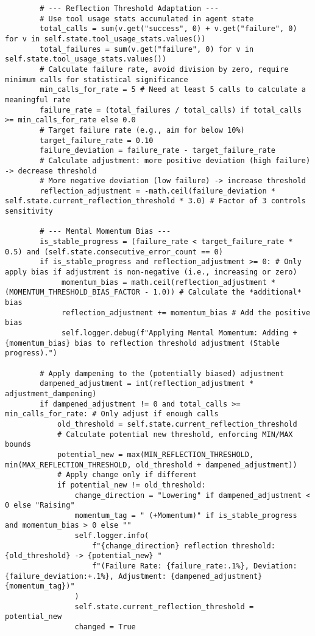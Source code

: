 \documentclass[12pt,a4paper]{article}
\begin{document}
\begin{pageablecode}
\begin{verbatim}
        # --- Reflection Threshold Adaptation ---
        # Use tool usage stats accumulated in agent state
        total_calls = sum(v.get("success", 0) + v.get("failure", 0) for v in self.state.tool_usage_stats.values())
        total_failures = sum(v.get("failure", 0) for v in self.state.tool_usage_stats.values())
        # Calculate failure rate, avoid division by zero, require minimum calls for statistical significance
        min_calls_for_rate = 5 # Need at least 5 calls to calculate a meaningful rate
        failure_rate = (total_failures / total_calls) if total_calls >= min_calls_for_rate else 0.0
        # Target failure rate (e.g., aim for below 10%)
        target_failure_rate = 0.10
        failure_deviation = failure_rate - target_failure_rate
        # Calculate adjustment: more positive deviation (high failure) -> decrease threshold
        # More negative deviation (low failure) -> increase threshold
        reflection_adjustment = -math.ceil(failure_deviation * self.state.current_reflection_threshold * 3.0) # Factor of 3 controls sensitivity

        # --- Mental Momentum Bias ---
        is_stable_progress = (failure_rate < target_failure_rate * 0.5) and (self.state.consecutive_error_count == 0)
        if is_stable_progress and reflection_adjustment >= 0: # Only apply bias if adjustment is non-negative (i.e., increasing or zero)
             momentum_bias = math.ceil(reflection_adjustment * (MOMENTUM_THRESHOLD_BIAS_FACTOR - 1.0)) # Calculate the *additional* bias
             reflection_adjustment += momentum_bias # Add the positive bias
             self.logger.debug(f"Applying Mental Momentum: Adding +{momentum_bias} bias to reflection threshold adjustment (Stable progress).")

        # Apply dampening to the (potentially biased) adjustment
        dampened_adjustment = int(reflection_adjustment * adjustment_dampening)
        if dampened_adjustment != 0 and total_calls >= min_calls_for_rate: # Only adjust if enough calls
            old_threshold = self.state.current_reflection_threshold
            # Calculate potential new threshold, enforcing MIN/MAX bounds
            potential_new = max(MIN_REFLECTION_THRESHOLD, min(MAX_REFLECTION_THRESHOLD, old_threshold + dampened_adjustment))
            # Apply change only if different
            if potential_new != old_threshold:
                change_direction = "Lowering" if dampened_adjustment < 0 else "Raising"
                momentum_tag = " (+Momentum)" if is_stable_progress and momentum_bias > 0 else ""
                self.logger.info(
                    f"{change_direction} reflection threshold: {old_threshold} -> {potential_new} "
                    f"(Failure Rate: {failure_rate:.1%}, Deviation: {failure_deviation:+.1%}, Adjustment: {dampened_adjustment}{momentum_tag})"
                )
                self.state.current_reflection_threshold = potential_new
                changed = True


\end{verbatim}
\end{pageablecode}
\end{document}
